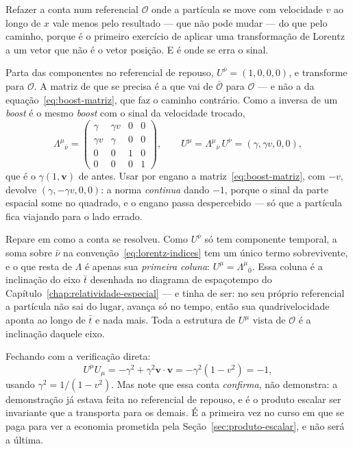\documentclass[12pt,a4paper,oneside]{book}
\theoremstyle{rgplain}
\theoremstyle{rgremark}
\newcommand{\obs}{\mathcal{O}}
\newcommand{\obsl}{\bar{\mathcal{O}}}
\begin{document}
\begin{atencao}[title={\sffamily\bfseries\footnotesize\color{rgTerracota}CONFERINDO EM OUTRO REFERENCIAL}]
Refazer a conta num referencial $\obs$ onde a partícula se move com velocidade
$v$ ao longo de $x$ vale menos pelo resultado --- que não pode mudar --- do que
pelo caminho, porque é o primeiro exercício de aplicar uma transformação de
Lorentz a um vetor que não é o vetor posição. E é onde se erra o sinal.

Parta das componentes no referencial de repouso, $U^{\bar\nu}=(1,0,0,0)$, e
transforme para $\obs$. A matriz de que se precisa é a que vai de $\obsl$
para $\obs$
--- e não a da equação~\eqref{eq:boost-matriz}, que faz o caminho contrário.
Como a inversa de um \emph{boost} é o mesmo \emph{boost} com o sinal da
velocidade trocado,
\[
  \Lambda^{\mu}{}_{\bar\nu}=
  \begin{pmatrix}
    \gamma & \gamma v & 0 & 0\\
    \gamma v & \gamma & 0 & 0\\
    0 & 0 & 1 & 0\\
    0 & 0 & 0 & 1
  \end{pmatrix},
  \qquad
  U^{\mu}=\Lambda^{\mu}{}_{\bar\nu}\,U^{\bar\nu}=(\gamma,\gamma v,0,0),
\]
que é o $\gamma(1,\bm v)$ de antes. Usar por engano a
matriz~\eqref{eq:boost-matriz}, com $-v$, devolve $(\gamma,-\gamma v,0,0)$: a
norma \emph{continua} dando $-1$, porque o sinal da parte espacial some no
quadrado, e o engano passa despercebido --- só que a partícula fica viajando
para o lado errado.

Repare em como a conta se resolveu. Como $U^{\bar\nu}$ só tem componente temporal,
a soma sobre $\bar\nu$ na
convenção~\eqref{eq:lorentz-indices} tem um único termo sobrevivente, e o que
resta de $\Lambda$ é apenas sua \emph{primeira coluna}:
$U^\mu=\Lambda^\mu{}_{\bar 0}$. Essa coluna é a inclinação do eixo $\bar t$ desenhada
no diagrama de espaçotempo do Capítulo~\ref{chap:relatividade-especial} --- e
tinha de ser: no seu próprio referencial a partícula não sai do lugar, avança
só no tempo, então sua quadrivelocidade aponta ao longo de $\bar t$ e nada mais.
Toda a estrutura de $U^\mu$ vista de $\obs$ é a inclinação daquele eixo.

Fechando com a verificação direta:
\[
  U^\mu U_\mu=-\gamma^2+\gamma^2\bm v\cdot\bm v=-\gamma^2(1-v^2)=-1,
\]
usando $\gamma^2=1/(1-v^2)$. Mas note que essa conta \emph{confirma}, não
demonstra: a demonstração já estava feita no referencial de repouso, e é o
produto escalar ser invariante que a transporta para os demais. É a primeira
vez no curso em que se paga para ver a economia prometida pela
Seção~\ref{sec:produto-escalar}, e não será a última.
\end{atencao}
\end{document}
